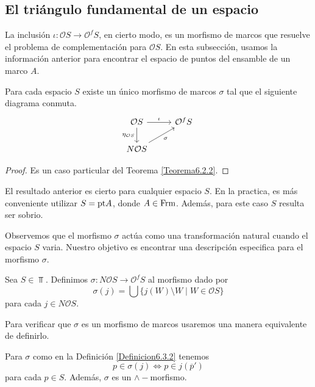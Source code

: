 \subsection{El triángulo fundamental de un espacio}

La inclusión $\iota\colon \mathcal{O}S\to \mathcal{O}^fS$, en cierto modo, es un morfismo de marcos que resuelve el problema de complementación para $\mathcal{O}S$. En esta subsección, usamos la información anterior para encontrar el espacio de puntos del ensamble de un marco $A$.

\begin{lem}\label{Lema6.3.1}
    Para cada espacio $S$ existe un único morfismo de marcos $\sigma$ tal que el siguiente diagrama conmuta.
\[\begin{tikzcd}
	{\mathcal{O}S} & {\mathcal{O} ^fS} \\
	{N\mathcal{O}S}
	\arrow["\iota", from=1-1, to=1-2]
	\arrow["{\eta_{\mathcal{O}S}}"', from=1-1, to=2-1]
	\arrow["\sigma"', from=2-1, to=1-2]
\end{tikzcd}\]
\end{lem}

\begin{proof}
    Es un caso particular del Teorema \ref{Teorema6.2.2}.
\end{proof}

El resultado anterior es cierto para cualquier espacio $S$. En la practica, es más conveniente utilizar $S=\mathrm{pt} A$, donde $A\in \mathrm{Frm}$. Además, para este caso $S$ resulta ser sobrio.

Observemos que el morfismo $\sigma$ actúa como una transformación natural cuando el espacio $S$ varia. Nuestro objetivo es encontrar una descripción especifica para el morfismo $\sigma$.

\begin{dfn}\label{Definicion6.3.2}
    Sea $S\in \Top$. Definimos $\sigma\colon N\mathcal{O}S\to \mathcal{O}^fS$ al morfismo dado por 
    \[
    \sigma(j)=\bigcup\{j(W)\setminus W\mid W\in \mathcal{O}S\}
    \]
    para cada $j\in N\mathcal{O}S$.
\end{dfn}

Para verificar que $\sigma$ es un morfismo de marcos usaremos una manera equivalente de definirlo.

\begin{lem}\label{Lema6.3.3}
    Para $\sigma$ como en la Definición \ref{Definicion6.3.2} tenemos 
    \[
    p\in \sigma(j)\Leftrightarrow p\in j(\overline{p}')
    \]
    para cada $p\in S$. Además, $\sigma$ es un $\wedge-$morfismo.
\end{lem}

